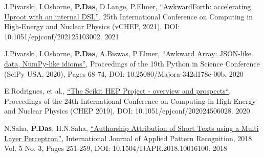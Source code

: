 \documentclass[10pt, letterpaper]{fulldeps}
\begin{document}
%
%
\small{\begin{tightitemize}
    \item J.Pivarski, I.Osborne, {\textbf{P.Das}}, D.Lange, P.Elmer, {\href{https://www.epj-conferences.org/articles/epjconf/abs/2021/05/epjconf_chep2021_03002/epjconf_chep2021_03002.html}{``AwkwardForth: accelerating Uproot with an internal DSL''}}, 25th International Conference on Computing in High-Energy and Nuclear Physics (vCHEP, 2021), DOI: 10.1051/epjconf/202125103002. \hfill{2021}
    \item J.Pivarski, I.Osborne, {\textbf{P.Das}}, A.Biswas, P.Elmer, {\href{http://conference.scipy.org/proceedings/scipy2020/jim_pivarski.html}{``Awkward Array: JSON-like data, NumPy-like idioms''}}, Proceedings of the 19th Python in Science Conference (SciPy USA, 2020), Pages 68-74, DOI: 10.25080/Majora-342d178e-00b. \hfill{2020}
    \item E.Rodrigues, et al., {\href{https://www.epj-conferences.org/articles/epjconf/abs/2020/21/epjconf_chep2020_06028/epjconf_chep2020_06028.html}{``The Scikit HEP Project - overview and prospects``}}, Proceedings of the 24th International Conference on Computing in High Energy and Nuclear Physics (CHEP 2019), DOI: 10.1051/epjconf/202024506028.  \hfill{2020}
    \item N.Saha, {\textbf{P.Das}}, H.N.Saha, {\href{https://www.inderscienceonline.com/doi/abs/10.1504/IJAPR.2018.094819}{``Authorship Attribution of Short Texts using a Multi Layer Perceptron''}}, International Journal of Applied Pattern Recognition, 2018 Vol. 5 No. 3, Pages 251-259, DOI: 10.1504/IJAPR.2018.10016100. \hfill{2018}
\end{tightitemize}}
\end{document}
